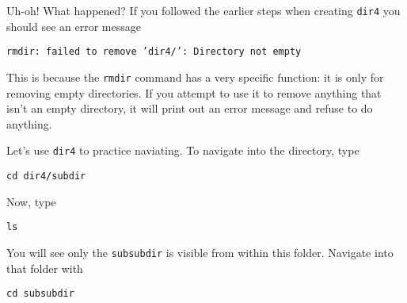 \documentclass[aps,showpacs,prd,notitlepage,preprintnumbers,amsmath,amssymb,letterpaper]{revtex4}
\begin{document}
Uh-oh! What happened?
If you followed the earlier steps when creating \verb|dir4| you should see an error message

\begin{verbatim}
rmdir: failed to remove ’dir4/’: Directory not empty
\end{verbatim}

This is because the \verb|rmdir| command has a very specific function: it is only for removing empty directories.
If you attempt to use it to remove anything that isn't an empty directory, it will print out an error message and refuse to do anything.

Let's use \verb|dir4| to practice naviating. To navigate into the directory, type

\begin{verbatim}
cd dir4/subdir
\end{verbatim}

Now, type

\begin{verbatim}
ls
\end{verbatim}

You will see only the \verb|subsubdir| is visible from within this folder.
Navigate into that folder with

\begin{verbatim}
cd subsubdir
\end{verbatim}
\end{document}
